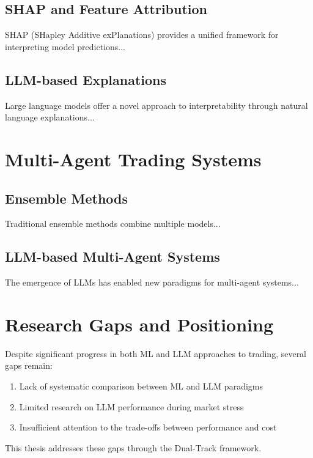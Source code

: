 \subsection{SHAP and Feature Attribution}

SHAP (SHapley Additive exPlanations) provides a unified framework for interpreting model predictions...

\subsection{LLM-based Explanations}

Large language models offer a novel approach to interpretability through natural language explanations...

\section{Multi-Agent Trading Systems}

\subsection{Ensemble Methods}

Traditional ensemble methods combine multiple models...

\subsection{LLM-based Multi-Agent Systems}

The emergence of LLMs has enabled new paradigms for multi-agent systems...

\section{Research Gaps and Positioning}

Despite significant progress in both ML and LLM approaches to trading, several gaps remain:

\begin{enumerate}
    \item Lack of systematic comparison between ML and LLM paradigms
    \item Limited research on LLM performance during market stress
    \item Insufficient attention to the trade-offs between performance and cost
\end{enumerate}

This thesis addresses these gaps through the Dual-Track framework.